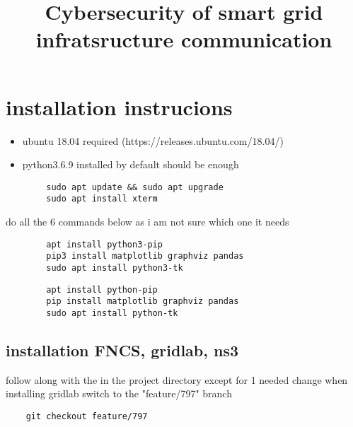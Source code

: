 \documentclass{masterthesis-uc2-en}
\title{Cybersecurity of smart grid infratsructure communication}
\begin{document}
\frontmatter
	\pagestyle{plain}
	
	\hypersetup{citecolor=blue}
	
	
	





	\section{installation instrucions}
	
	
	\firmlist
	\begin{itemize}
		\item ubuntu 18.04 required (https://releases.ubuntu.com/18.04/)
		\item python3.6.9 installed by default should be enough
	\end{itemize}
	
	
	\begin{lstlisting}
		sudo apt update && sudo apt upgrade
		sudo apt install xterm
	\end{lstlisting}

	
	do all the 6 commands below as i am not sure which one it needs 

	\begin{lstlisting}
		apt install python3-pip
		pip3 install matplotlib graphviz pandas
		sudo apt install python3-tk	
	\end{lstlisting}


	\begin{lstlisting}
		apt install python-pip
		pip install matplotlib graphviz pandas
		sudo apt install python-tk
	\end{lstlisting}



	\subsection{installation FNCS, gridlab, ns3}
	follow along with the   in the project directory except for 1 needed change
	when installing gridlab switch to the "feature/797" branch
	\begin{lstlisting}
	git checkout feature/797
	\end{lstlisting}
\end{document}
